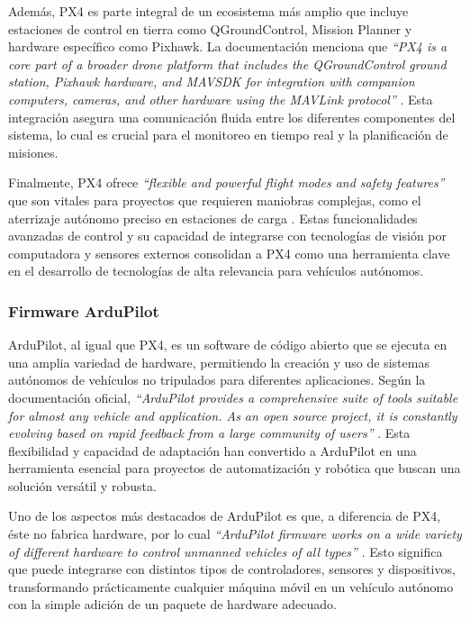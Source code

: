     Además, PX4 es parte integral de un ecosistema más amplio que incluye estaciones de control en tierra como QGroundControl, Mission Planner y hardware específico como Pixhawk. La documentación menciona que \textit{``PX4 is a core part of a broader drone platform that includes the QGroundControl ground station, Pixhawk hardware, and MAVSDK for integration with companion computers, cameras, and other hardware using the MAVLink protocol''} \cite{px4_docs}. Esta integración asegura una comunicación fluida entre los diferentes componentes del sistema, lo cual es crucial para el monitoreo en tiempo real y la planificación de misiones.

    Finalmente, PX4 ofrece \textit{``flexible and powerful flight modes and safety features''} que son vitales para proyectos que requieren maniobras complejas, como el aterrizaje autónomo preciso en estaciones de carga \cite{px4_docs}. Estas funcionalidades avanzadas de control y su capacidad de integrarse con tecnologías de visión por computadora y sensores externos consolidan a PX4 como una herramienta clave en el desarrollo de tecnologías de alta relevancia para vehículos autónomos.
    
    \subsubsection{Firmware ArduPilot}
    ArduPilot, al igual que PX4, es un software de código abierto que se ejecuta en una amplia variedad de hardware, permitiendo la creación y uso de sistemas autónomos de vehículos no tripulados para diferentes aplicaciones. Según la documentación oficial, \textit{“ArduPilot provides a comprehensive suite of tools suitable for almost any vehicle and application. As an open source project, it is constantly evolving based on rapid feedback from a large community of users”} \cite{ardupilot_docs}. Esta flexibilidad y capacidad de adaptación han convertido a ArduPilot en una herramienta esencial para proyectos de automatización y robótica que buscan una solución versátil y robusta.

    Uno de los aspectos más destacados de ArduPilot es que, a diferencia de PX4, éste no fabrica hardware, por lo cual \textit{“ArduPilot firmware works on a wide variety of different hardware to control unmanned vehicles of all types”} \cite{ardupilot_docs}. Esto significa que puede integrarse con distintos tipos de controladores, sensores y dispositivos, transformando prácticamente cualquier máquina móvil en un vehículo autónomo con la simple adición de un paquete de hardware adecuado.

